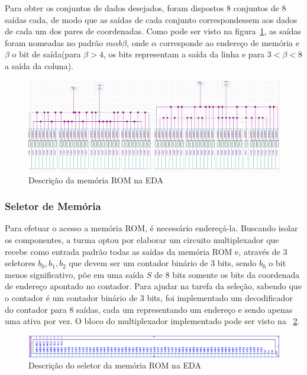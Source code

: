 \documentclass[12pt]{article}
\begin{document}
Para obter os conjuntos de dados desejados, foram dispostos 8 conjuntos de 8 saídas cada, de modo que as saídas de cada conjunto correspondessem aos dados de cada um dos pares de coordenadas. Como pode ser visto na figura~\ref{fig:mem-rom}, as saídas foram nomeadas no padrão $m\alpha b\beta$, onde $\alpha$ corresponde ao endereço de memória e $\beta$ o bit de saída(para $\beta>4$, os bits representam a saída da linha e para $3<\beta<8$ a saída da coluna).

\begin{figure}[!htbp]
\centering
\includegraphics[width=.8\textwidth]{img/rom-memory.png}
\caption{Descrição da memória ROM na EDA}
\label{fig:mem-rom}
\end{figure}

\subsubsection{Seletor de Memória}
Para efetuar o acesso a memória ROM, é necessário endereçá-la. Buscando isolar os componentes, a turma optou por elaborar um circuito multiplexador que recebe como entrada padrão todas as saídas da memória ROM e, através de 3 seletores $b_{0}, b_{1}, b_{2}$ que devem ser um contador binário de 3 bits, sendo $b_{0}$ o bit menos significativo, põe em uma saída $S$ de 8 bits somente os bits da coordenada de endereço apontado no contador. Para ajudar na tarefa da seleção, sabendo que o contador é um contador binário de 3 bits, foi implementado um decodificador do contador para 8 saídas, cada um representando um endereço e sendo apenas uma ativa por vez. O bloco do multiplexador implementado pode ser visto na ~\ref{fig:mux-mem}.

\begin{figure}[H]
\centering
\includegraphics[width=.9\textwidth]{img/mem-mux.png}
\caption{Descrição do seletor da memória ROM na EDA}
\label{fig:mux-mem}
\end{figure}
\end{document}
